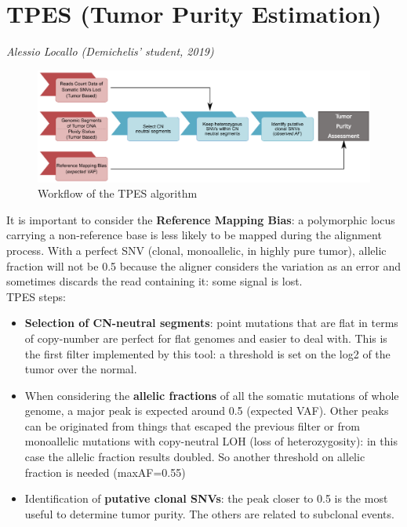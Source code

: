 \section{TPES (Tumor Purity Estimation)}
\textit{Alessio Locallo (Demichelis' student, 2019)}\\

\begin{figure}[!ht]
\centering
    \includegraphics[width=0.7\linewidth]{tpes.png}
    \caption{\label{fig:tpes}Workflow of the TPES algorithm}
\end{figure}

It is important to consider the \textbf{Reference Mapping Bias}: a polymorphic
locus carrying a non-reference base is less likely to be mapped during the
alignment process. With a perfect SNV (clonal, monoallelic, in highly pure
tumor), allelic fraction will not be 0.5 because the aligner considers the
variation as an error and sometimes discards the read containing it: some signal
is lost.\\

TPES steps:
\begin{itemize}
    \item \textbf{Selection of CN-neutral segments}: point mutations that are
    flat in terms of copy-number are perfect for flat genomes and easier to deal
    with. This is the first filter implemented by this tool: a threshold is set
    on the log2 of the tumor over the normal.
    \item When considering the \textbf{allelic fractions} of all the somatic
    mutations of whole genome, a major peak is expected around 0.5 (expected
    VAF). Other peaks can be originated from things that escaped the previous
    filter or from monoallelic mutations with copy-neutral LOH (loss of
    heterozygosity): in this case the allelic fraction results doubled. So
    another threshold on allelic fraction is needed (maxAF=0.55)
    \item Identification of \textbf{putative clonal SNVs}: the peak closer to
    0.5 is the most useful to determine tumor purity. The others are related to
    subclonal events.
\end{itemize}

